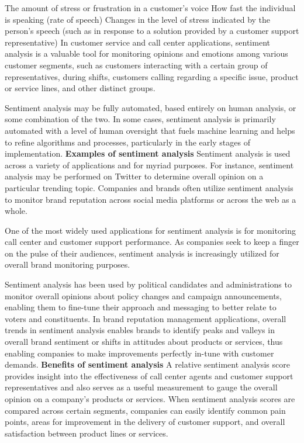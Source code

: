 \documentclass[a4paper, 12pt]{extarticle}
\begin{document}
{The amount of stress or frustration in a customer’s voice
How fast the individual is speaking (rate of speech)
Changes in the level of stress indicated by the person’s speech (such as in response to a solution provided by a customer support representative)
In customer service and call center applications, sentiment analysis is a valuable tool for monitoring opinions and emotions among various customer segments, such as customers interacting with a certain group of representatives, during shifts, customers calling regarding a specific issue, product or service lines, and other distinct groups.

Sentiment analysis may be fully automated, based entirely on human analysis, or some combination of the two. In some cases, sentiment analysis is primarily automated with a level of human oversight that fuels machine learning and helps to refine algorithms and processes, particularly in the early stages of implementation.
\textbf{Examples of sentiment analysis}
Sentiment analysis is used across a variety of applications and for myriad purposes. For instance, sentiment analysis may be performed on Twitter to determine overall opinion on a particular trending topic. Companies and brands often utilize sentiment analysis to monitor brand reputation across social media platforms or across the web as a whole.

One of the most widely used applications for sentiment analysis is for monitoring call center and customer support performance. As companies seek to keep a finger on the pulse of their audiences, sentiment analysis is increasingly utilized for overall brand monitoring purposes.

Sentiment analysis has been used by political candidates and administrations to monitor overall opinions about policy changes and campaign announcements, enabling them to fine-tune their approach and messaging to better relate to voters and constituents. In brand reputation management applications, overall trends in sentiment analysis enables brands to identify peaks and valleys in overall brand sentiment or shifts in attitudes about products or services, thus enabling companies to make improvements perfectly in-tune with customer demands.
\textbf{Benefits of sentiment analysis}
A relative sentiment analysis score provides insight into the effectiveness of call center agents and customer support representatives and also serves as a useful measurement to gauge the overall opinion on a company’s products or services. When sentiment analysis scores are compared across certain segments, companies can easily identify common pain points, areas for improvement in the delivery of customer support, and overall satisfaction between product lines or services.

}
\end{document}

